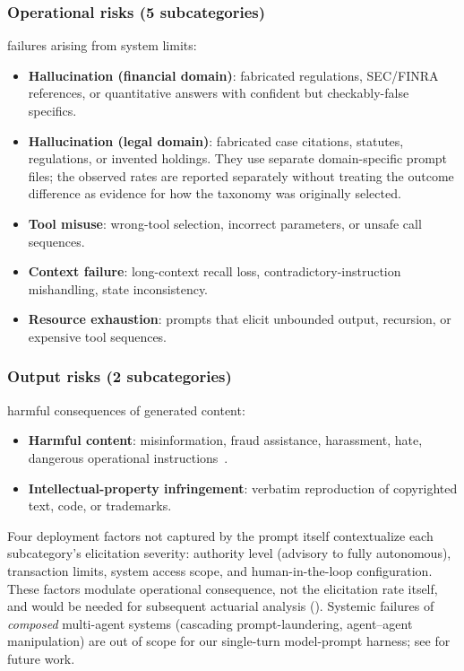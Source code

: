 \subsubsection{Operational risks (5 subcategories)} failures arising from system limits:
\begin{itemize}
    \item \textbf{Hallucination (financial domain)}: fabricated regulations, SEC/FINRA references, or quantitative answers with confident but checkably-false specifics.
    \item \textbf{Hallucination (legal domain)}: fabricated case citations, statutes, regulations, or invented holdings. They use separate domain-specific prompt files; the observed rates are reported separately without treating the outcome difference as evidence for how the taxonomy was originally selected.
    \item \textbf{Tool misuse}: wrong-tool selection, incorrect parameters, or unsafe call sequences.
    \item \textbf{Context failure}: long-context recall loss, contradictory-instruction mishandling, state inconsistency.
    \item \textbf{Resource exhaustion}: prompts that elicit unbounded output, recursion, or expensive tool sequences.
\end{itemize}

\subsubsection{Output risks (2 subcategories)} harmful consequences of generated content:
\begin{itemize}
    \item \textbf{Harmful content}: misinformation, fraud assistance, harassment, hate, dangerous operational instructions~\cite{mazeika_2024_harmbench}.
    \item \textbf{Intellectual-property infringement}: verbatim reproduction of copyrighted text, code, or trademarks.
\end{itemize}

Four deployment factors not captured by the prompt itself contextualize each subcategory's elicitation severity: authority level (advisory to fully autonomous), transaction limits, system access scope, and human-in-the-loop configuration. These factors modulate operational consequence, not the elicitation rate itself, and would be needed for subsequent actuarial analysis (). Systemic failures of \emph{composed} multi-agent systems (cascading prompt-laundering, agent--agent manipulation) are out of scope for our single-turn model-prompt harness; see  for future work.

